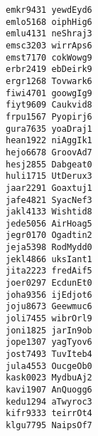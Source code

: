 \documentclass{article}
\begin{document}
    \texttt{emkr9431 yewdEyd6} \\
    \texttt{emlo5168 oiphHig6} \\
    \texttt{emlu4131 neShraj3} \\
    \texttt{emsc3203 wirrAps6} \\
    \texttt{emst7170 cokWowg9} \\
    \texttt{erbr2419 ebDeirk9} \\
    \texttt{ergr1268 Tovwark6} \\
    \texttt{fiwi4701 goowgIg9} \\
    \texttt{fiyt9609 Caukvid8} \\
    \texttt{frpu1567 Pyopirj6} \\
    \texttt{gura7635 yoaDraj1} \\
    \texttt{hean1922 niAggIk1} \\
    \texttt{hejo6678 GroovAd7} \\
    \texttt{hesj2855 Dabgeat0} \\
    \texttt{huli1715 UtDerux3} \\
    \texttt{jaar2291 Goaxtuj1} \\
    \texttt{jafe4821 SyacNef3} \\
    \texttt{jakl4133 Wishtid8} \\
    \texttt{jede5056 AirHoag5} \\
    \texttt{jegr0170 Ogadtin2} \\
    \texttt{jeja5398 RodMydd0} \\
    \texttt{jekl4866 uksIant1} \\
    \texttt{jita2223 fredAif5} \\
    \texttt{joer0297 EcdunEt0} \\
    \texttt{joha9356 ijEdjot6} \\
    \texttt{joju8673 Geewmuc6} \\
    \texttt{joli7455 wibrOrl9} \\
    \texttt{joni1825 jarIn9ob} \\
    \texttt{jope1307 yagTyov6} \\
    \texttt{jost7493 TuvIteb4} \\
    \texttt{jula4553 OucgeOb0} \\
    \texttt{kask0023 MydbuAj2} \\
    \texttt{kavi1907 AnQuogg6} \\
    \texttt{kedu1294 aTwyroc3} \\
    \texttt{kifr9333 teirrOt4} \\
    \texttt{klgu7795 NaipsOf7} \\
\end{document}
